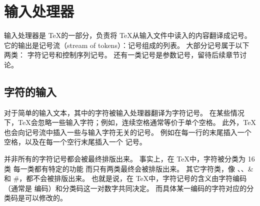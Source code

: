 \documentclass{book}
\begin{document}
\section{输入处理器}

输入处理器是 \TeX 的一部分，负责将 \TeX 从输入文件中读入的内容翻译成记号。
它的输出是记号流（stream of tokens）：记号组成的列表。
大部分记号属于以下两类：
字符记号和控制序列记号。
还有一类记号是参数记号，留待后续章节讨论。

\subsection{字符的输入}

对于简单的输入文本，其中的字符被输入处理器翻译为字符记号。
在某些情况下，\TeX 会忽略一些输入字符；例如，连续空格通常等价于单个空格。
此外，\TeX 也会向记号流中插入一些与输入字符无关的记号。
例如在每一行的末尾插入一个空格，以及在每一个空行末尾插入一个  记号。

并非所有的字符记号都会被最终排版出来。
事实上，在 \TeX 中，字符被分类为 16 类
\ldash 每一类都有特定的功能\rdash%
而只有两类最终会被排版出来。
其它字符类，像 、、\n\&
和 \n\#，都不会被排版出来。
也就是说，在 \TeX 中，字符记号的含义由字符编码（通常是 \ascii 编码）和分类码这一对数字共同决定。
而具体某一编码的字符对应的分类码是可以修改的。
\end{document}
